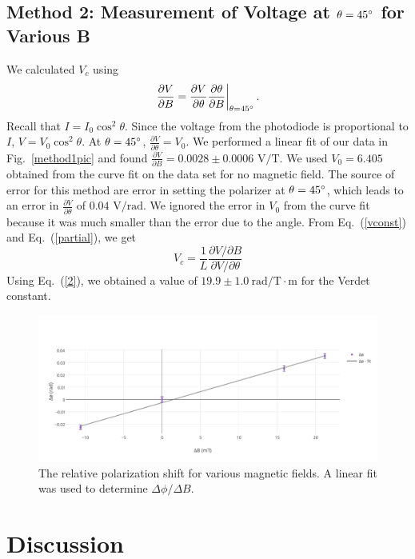 \documentclass[prb,preprint]{revtex4-1}
\begin{document}
{\subsection{Method 2: Measurement of Voltage at $\theta = 45\degree$ for Various B}
{We calculated $V_{c}$ using 
\begin{equation}
\label{partial}
\left. \frac{\partial V}{\partial B}=\frac{\partial V}{\partial \theta} \frac{\partial \theta}{\partial B}\right|_{\theta=45\degree}.
\end{equation}
Recall that $I=I_{0}\cos^2{\theta}$. Since the voltage from the photodiode is proportional to $I$, $V=V_{0}\cos^2{\theta}$. At $\theta = 45\degree$, $\frac{\partial V}{\partial \theta}=V_0$. 
We performed a linear fit of our data in Fig.~\ref{method1pic} and found $\frac{\partial V}{\partial B}=0.0028\pm 0.0006 \textrm{~V/T}$. We used $V_0=6.405$ obtained from the curve fit on the data set for no magnetic field. The source of error for this method are error in setting the polarizer at $\theta=45\degree$, which leads to an error in $\frac{\partial V}{\partial \theta}$ of $0.04\textrm{~V/rad}$. We ignored the error in $V_0$ from the curve fit because it was much smaller than the error due to the angle.
From Eq.~(\ref{vconst}) and Eq.~(\ref{partial}), we get
\begin{equation}
\label{2}
V_{c} =\frac{1}{L}  \frac{\partial V/\partial B}{\partial V/\partial \theta} 
\end{equation}
Using  Eq.~(\ref{2}), we obtained a value of $19.9 \pm 1.0 \mathrm{~rad/T} \cdot \textrm{m}$ for the Verdet constant. 

\begin{figure}
\includegraphics[width =6.3in]{verdet1.pdf}
\caption{\label{method2pic} The relative polarization shift for various magnetic fields. A linear fit was used to determine $\Delta \phi/\Delta B$.}
\end{figure}
}
\section{Discussion}

}
\end{document}
